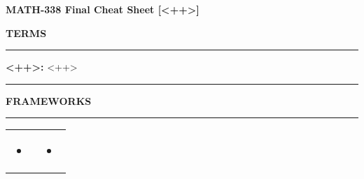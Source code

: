 \documentclass[6pt]{article}
\begin{document}
\begin{footnotesize}

\begin{center}
\textbf{MATH-338 Final Cheat Sheet [<++>]}
\end{center}

\textbf{TERMS}

\par\noindent\rule{\textwidth}{0.4pt}
\textbf{<++>:} <++>

\par\noindent\rule{\textwidth}{0.4pt}

\textbf{FRAMEWORKS}
\par\noindent\rule{\textwidth}{0.4pt}

\begin{tabular}{l | l}

\parbox{0.5\textwidth}{

\begin{itemize}

\item <++>
\end{itemize}

}

&

\parbox{0.5\textwidth}{
\begin{flushright}
\begin{itemize}

\item <++>

\end{itemize}
\end{flushright}
}

\end{tabular}
\end{footnotesize}
\end{document}
